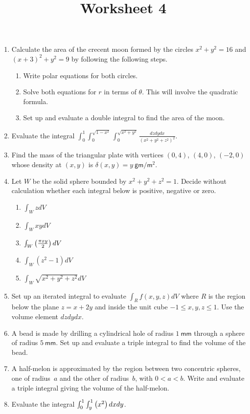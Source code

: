 \documentclass[12pt]{article}
\title{Worksheet 4}
\author{}\date{}
\let\sin\relax\DeclareMathOperator{\sin}{\mathsf{sin}}
\begin{document}
\maketitle
\thispagestyle{empty}

\begin{enumerate}
\item Calculate the area of the crecent moon formed by
the circles $x^2+y^2=16$ and $\left(x+3\right)^2+y^2=9$
by following the following steps.
\begin{enumerate}
\item Write polar equations for both circles.
\item Solve both equations for $r$ in terms of $\theta$. This
will involve the quadratic formula.
\item Set up and evaluate a double integral to find the area
of the moon.
\end{enumerate}

\item Evaluate the integral
$\int_0^1\int_0^{\sqrt{1-x^2}}\int_0^{\sqrt{x^2+y^2}}
\frac{dzdydx}{\left(x^2+y^2+z^2\right)^2}$.

\item Find the mass of the triangular plate with vertices
$\left(0,4\right)$, $\left(4,0\right)$, $\left(-2,0\right)$
whose density at $\left(x,y\right)$ is $\delta\left(x,y\right)
=y~\mathsf{gm}/\mathsf{m}^2$.

\item Let $W$ be the solid sphere bounded by $x^2+y^2+z^2=1$.
Decide without calculation whether each integral below
is positive, negative or zero.
\begin{enumerate}
\item $\int_WzdV$
\item $\int_WxydV$
\item $\int_W\sin\left(\frac{\pi xy}{2}\right)dV$
\item $\int_W\left(z^2-1\right)dV$
\item $\int_W\sqrt{x^2+y^2+z^2}dV$
\end{enumerate}

\item Set up an iterated integral to evaluate
$\int_Rf\left(x,y,z\right)dV$ where $R$ is
the region below the plane $z=x+2y$ and inside
the unit cube $-1\le x,y,z\le 1$. Use the volume
element $dzdydx$.

\item A bead is made by drilling a cylindrical
hole of radius $1~\mathsf{mm}$ through a sphere
of radius $5~\mathsf{mm}$. Set up and evaluate
a triple integral to find the volume of the bead.

\item A half-melon is approximated by the region
between two concentric spheres, one of radius~$a$
and the other of radius~$b$, with $0<a<b$. Write
and evaluate a triple integral giving the volume
of the half-melon.

\item Evaluate the integral
$\int_0^1\int_y^1\sin\left(x^2\right)dxdy$.

\end{enumerate}
\end{document}
